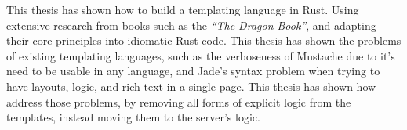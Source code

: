 This thesis has shown how to build a templating language in Rust. Using extensive research from books such as the \textit{``The Dragon Book''}\cite{DragonBook}, and adapting their core principles into idiomatic Rust code. This thesis has shown the problems of existing templating languages, such as the verboseness of Mustache due to it's need to be usable in any language, and Jade's syntax problem when trying to have layouts, logic, and rich text in a single page. This thesis has shown how \languageName{} address those problems, by removing all forms of explicit logic from the templates, instead moving them to the server's logic.